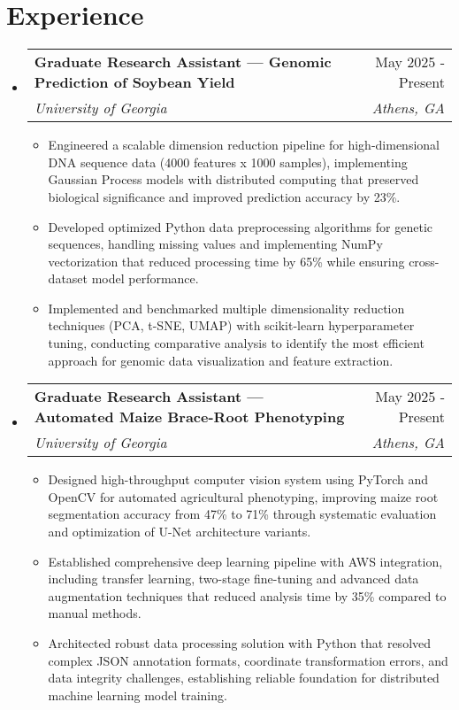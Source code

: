 \documentclass[letterpaper,10.5pt]{article}
\makeatletter
\newcommand{\resumeItem}[1]{
  \item{
    {#1 \vspace{-3pt}}
  }
}
\newcommand{\resumeSubheading}[4]{
  \vspace{-2pt}\item
    \begin{tabular*}{0.97\textwidth}{l@{\extracolsep{\fill}}r}
      \textbf{#1} & #2 \\
      \textit{#3} & \textit{#4} \\
    \end{tabular*}\vspace{-6pt}
}
\newcommand{\resumeSubHeadingListStart}{\begin{itemize}[leftmargin=*]}
\newcommand{\resumeSubHeadingListEnd}{\end{itemize}}
\newcommand{\resumeItemListStart}{\begin{itemize}}
\newcommand{\resumeItemListEnd}{\end{itemize}\vspace{-6pt}}
\makeatother
\begin{document}
\section{Experience}
  \resumeSubHeadingListStart
    \resumeSubheading
      {Graduate Research Assistant — Genomic Prediction of Soybean Yield}{May 2025 - Present}
      {University of Georgia}{Athens, GA}
      \resumeItemListStart
        \resumeItem{Engineered a scalable dimension reduction pipeline for high-dimensional DNA sequence data (4000 features x 1000 samples), implementing Gaussian Process models with distributed computing that preserved biological significance and improved prediction accuracy by 23\%.}
        \resumeItem{Developed optimized Python data preprocessing algorithms for genetic sequences, handling missing values and implementing NumPy vectorization that reduced processing time by 65\% while ensuring cross-dataset model performance.}
        \resumeItem{Implemented and benchmarked multiple dimensionality reduction techniques (PCA, t-SNE, UMAP) with scikit-learn hyperparameter tuning, conducting comparative analysis to identify the most efficient approach for genomic data visualization and feature extraction.}
      \resumeItemListEnd
      
    \resumeSubheading
      {Graduate Research Assistant — Automated Maize Brace-Root Phenotyping}{May 2025 - Present}
      {University of Georgia}{Athens, GA}
      \resumeItemListStart
        \resumeItem{Designed high-throughput computer vision system using PyTorch and OpenCV for automated agricultural phenotyping, improving maize root segmentation accuracy from 47\% to 71\% through systematic evaluation and optimization of U-Net architecture variants.}
        \resumeItem{Established comprehensive deep learning pipeline with AWS integration, including transfer learning, two-stage fine-tuning and advanced data augmentation techniques that reduced analysis time by 35\% compared to manual methods.}
        \resumeItem{Architected robust data processing solution with Python that resolved complex JSON annotation formats, coordinate transformation errors, and data integrity challenges, establishing reliable foundation for distributed machine learning model training.}
      \resumeItemListEnd
  \resumeSubHeadingListEnd

\end{document}
